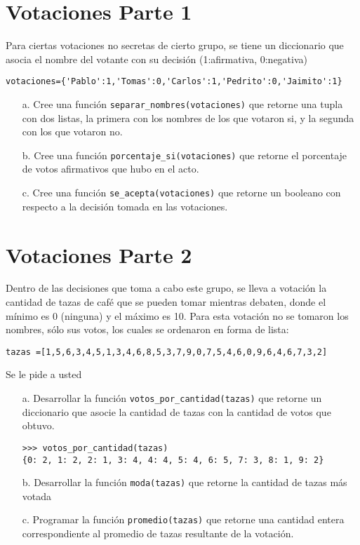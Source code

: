 \section{Votaciones Parte 1}
Para ciertas votaciones no secretas de cierto grupo, se tiene un diccionario que asocia el nombre del votante con su decisión (1:afirmativa, 0:negativa)

\begin{lstlisting}[style=consola]
votaciones={'Pablo':1,'Tomas':0,'Carlos':1,'Pedrito':0,'Jaimito':1}
\end{lstlisting}

\begin{itemize}
    \item[a.] Cree una función \texttt{separar\_nombres(votaciones)} que retorne una tupla con dos listas, la primera con los nombres de los que votaron si, y la segunda con los que votaron no.
    \item[b.] Cree una función \texttt{porcentaje\_si(votaciones)} que retorne el porcentaje de votos afirmativos que hubo en el acto.
    \item[c.] Cree una función \texttt{se\_acepta(votaciones)} que retorne un booleano con respecto a la decisión tomada en las votaciones.
\end{itemize}

\section{Votaciones Parte 2}

Dentro de las decisiones que toma a cabo este grupo, se lleva a votación la cantidad de tazas de café que se pueden tomar mientras debaten, donde el mínimo es 0 (ninguna) y el máximo es 10. Para esta votación no se tomaron los nombres, sólo sus votos, los cuales se ordenaron en forma de lista:

\begin{lstlisting}[style=consola]
tazas =[1,5,6,3,4,5,1,3,4,6,8,5,3,7,9,0,7,5,4,6,0,9,6,4,6,7,3,2]
\end{lstlisting}

Se le pide a usted

\begin{itemize}
    \item[a.] Desarrollar la función \texttt{votos\_por\_cantidad(tazas)} que retorne un diccionario que asocie la cantidad de tazas con la cantidad de votos que obtuvo.
    \begin{lstlisting}[style=consola]
>>> votos_por_cantidad(tazas)
{0: 2, 1: 2, 2: 1, 3: 4, 4: 4, 5: 4, 6: 5, 7: 3, 8: 1, 9: 2}
    \end{lstlisting}
    \item[b.] Desarrollar la función \texttt{moda(tazas)} que retorne la cantidad de tazas más votada
    \item[c.] Programar la función \texttt{promedio(tazas)} que retorne una cantidad entera correspondiente al promedio de tazas resultante de la votación.
\end{itemize}
